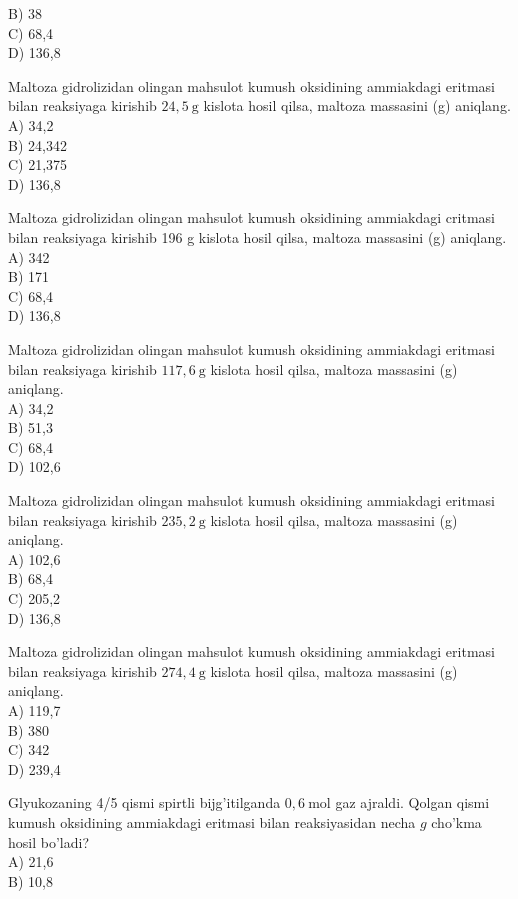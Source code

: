 B) 38\\
C) 68,4\\
D) 136,8
  \item Maltoza gidrolizidan olingan mahsulot kumush oksidining ammiakdagi eritmasi bilan reaksiyaga kirishib $24,5 \mathrm{~g}$ kislota hosil qilsa, maltoza massasini (g) aniqlang.\\
A) 34,2\\
B) 24,342\\
C) 21,375\\
D) 136,8
  \item Maltoza gidrolizidan olingan mahsulot kumush oksidining ammiakdagi critmasi bilan reaksiyaga kirishib 196 g kislota hosil qilsa, maltoza massasini (g) aniqlang.\\
A) 342\\
B) 171\\
C) 68,4\\
D) 136,8
  \item Maltoza gidrolizidan olingan mahsulot kumush oksidining ammiakdagi eritmasi bilan reaksiyaga kirishib $117,6 \mathrm{~g}$ kislota hosil qilsa, maltoza massasini (g) aniqlang.\\
A) 34,2\\
B) 51,3\\
C) 68,4\\
D) 102,6
  \item Maltoza gidrolizidan olingan mahsulot kumush oksidining ammiakdagi eritmasi bilan reaksiyaga kirishib $235,2 \mathrm{~g}$ kislota hosil qilsa, maltoza massasini (g) aniqlang.\\
A) 102,6\\
B) 68,4\\
C) 205,2\\
D) 136,8
  \item Maltoza gidrolizidan olingan mahsulot kumush oksidining ammiakdagi eritmasi\\
bilan reaksiyaga kirishib $274,4 \mathrm{~g}$ kislota hosil qilsa, maltoza massasini (g) aniqlang.\\
A) 119,7\\
B) 380\\
C) 342\\
D) 239,4
  \item Glyukozaning 4/5 qismi spirtli bijg'itilganda $0,6 \mathrm{~mol}$ gaz ajraldi. Qolgan qismi kumush oksidining ammiakdagi eritmasi bilan reaksiyasidan necha $g$ cho'kma hosil bo'ladi?\\
A) 21,6\\
B) 10,8\\
